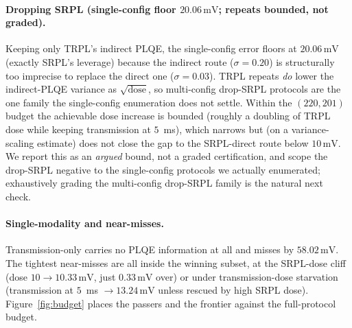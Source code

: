 \documentclass[11pt]{article}
\newcommand{\mV}{\,\mathrm{mV}}
\begin{document}
\paragraph{Dropping SRPL (single-config floor $20.06\mV$; repeats bounded, not graded).} Keeping only TRPL's indirect PLQE, the single-config error floors at $20.06\mV$ (exactly SRPL's leverage) because the indirect route ($\sigma=0.20$) is structurally too imprecise to replace the direct one ($\sigma=0.03$). TRPL repeats \emph{do} lower the indirect-PLQE variance as $\sqrt{\text{dose}}$, so multi-config drop-SRPL protocols are the one family the single-config enumeration does not settle. Within the $(220,201)$ budget the achievable dose increase is bounded (roughly a doubling of TRPL dose while keeping transmission at $5$~ms), which narrows but (on a variance-scaling estimate) does not close the gap to the SRPL-direct route below $10\mV$. We report this as an \emph{argued} bound, not a graded certification, and scope the drop-SRPL negative to the single-config protocols we actually enumerated; exhaustively grading the multi-config drop-SRPL family is the natural next check.

\paragraph{Single-modality and near-misses.} Transmission-only carries no PLQE information at all and misses by $58.02\mV$. The tightest near-misses are all inside the winning subset, at the SRPL-dose cliff (dose $10\to10.33\mV$, just $0.33\mV$ over) or under transmission-dose starvation (transmission at $5$~ms $\to 13.24\mV$ unless rescued by high SRPL dose). Figure~\ref{fig:budget} places the passers and the frontier against the full-protocol budget.
\end{document}
